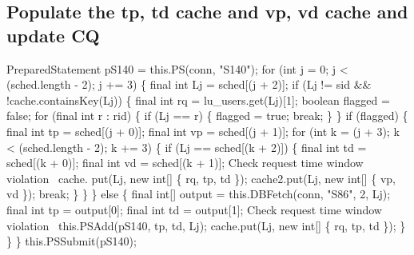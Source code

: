 \subsection{Populate the tp, td cache and vp, vd cache and update CQ}
\nwenddocs{}\endmoddef{}
PreparedStatement pS140 = this.PS(conn, "S140");
for (int j = 0; j < (sched.length - 2); j += 3) \{
  final int Lj = sched[(j + 2)];
  if (Lj != sid && !cache.containsKey(Lj)) \{
    final int rq = lu_users.get(Lj)[1];
    boolean flagged = false;
    for (final int r : rid) \{
      if (Lj == r) \{
        flagged = true;
        break;
      \}
    \}
    if (flagged) \{
      final int tp = sched[(j + 0)];
      final int vp = sched[(j + 1)];
      for (int k = (j + 3); k < (sched.length - 2); k += 3) \{
        if (Lj == sched[(k + 2)]) \{
          final int td = sched[(k + 0)];
          final int vd = sched[(k + 1)];
          \LA{}Check request time window violation~{\nwtagstyle{}}\RA{}
          cache. put(Lj, new int[] \{ rq, tp, td \});
          cache2.put(Lj, new int[] \{ vp, vd \});
          break;
        \}
      \}
    \} else \{
      final int[] output = this.DBFetch(conn, "S86", 2, Lj);
      final int tp = output[0];
      final int td = output[1];
      \LA{}Check request time window violation~{\nwtagstyle{}}\RA{}
      this.PSAdd(pS140, tp, td, Lj);
      cache.put(Lj, new int[] \{ rq, tp, td \});
    \}
  \}
\}
this.PSSubmit(pS140);
\nwendcode{}\nwdocspar

